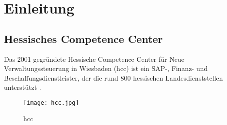 \documentclass[
    12pt,
    a4paper
]{article}
\begin{document}



\clearpage


\tableofcontents

\clearpage

\glsfindwidesttoplevelname
\printglossary[
    type=\acronymtype,
    title=Abkürzungsverzeichnis,
    toctitle=Abkürzungsverzeichnis
]

\clearpage

\listoffigures

\clearpage


\section{Einleitung}
\subsection{Hessisches Competence Center}
Das 2001 gegründete Hessische Competence Center für Neue Verwaltungssteuerung in Wiesbaden (\acrshort{hcc}) ist ein SAP-,
Finanz- und Beschaffungsdienstleister,
der die rund 800 hessischen Landesdienststellen unterstützt \cite{hcc-ueber-uns}.

\begin{figure}[H]
    \centering
    \texttt{[image: hcc.jpg]}
    \caption{\acrlong{hcc}}
\end{figure}

\clearpage


\setcounter{page}{4}

\printbibliography[
    title=Literaturverzeichnis,
    heading=bibintoc
]
\end{document}
